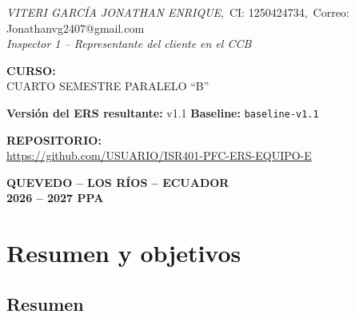 \documentclass[journal,onecolumn]{IEEEtran}
\newcommand{\guia}[2]{%
	\begin{mdframed}[style=guia]
		\sloppy
		\noindent\textbf{Responsable: #1}\\[2pt]
		#2
	\end{mdframed}
}
\newif\ifguias
\let\guiaoriginal\guia
\renewcommand{\guia}[2]{\ifguias\guiaoriginal{#1}{#2}\fi}
\begin{document}
\begin{titlepage}
		\textit{VITERI GARCÍA JONATHAN ENRIQUE},~CI: 1250424734,~Correo: Jonathanvg2407@gmail.com\\
		\textit{Inspector 1 -- Representante del cliente en el CCB}
		
		\vspace{0.5cm}
		
		{\normalsize\bfseries CURSO:}\\[4pt]
		{\normalsize CUARTO SEMESTRE PARALELO ``B''}
		
		\vspace{0.5cm}
		
		{\normalsize\bfseries Versión del ERS resultante:} v1.1 \quad
		{\normalsize\bfseries Baseline:} \texttt{baseline-v1.1}
		
		\vspace{0.3cm}
		
		{\normalsize\bfseries REPOSITORIO:}\\
		\url{https://github.com/USUARIO/ISR401-PFC-ERS-EQUIPO-E}
		
		\vspace{0.8cm}
		
		{\normalsize\bfseries QUEVEDO -- LOS RÍOS -- ECUADOR}\\[4pt]
		{\normalsize\bfseries 2026 -- 2027 PPA}
		
	\end{titlepage}
	
	\guia{Edson (Integrante 1)}{%
		Reemplazar \texttt{USUARIO} por el usuario real de GitHub y verificar que la URL quede en
		\textbf{una sola línea} y que el repositorio sea \textbf{público}: el criterio~G1 asigna
		CERO si la URL está rota o el repositorio no es accesible. Confirmar que la versión
		declarada aquí (v1.1) coincida exactamente con el historial de revisiones del ERS, con el
		\texttt{CHANGELOG.md} y con el tag de Git. Revisar también que los correos de la carátula
		sean los mismos configurados en \texttt{git config user.email} de cada integrante, para que
		la autoría de los commits quede vinculada (criterios~A2 y~A3).}
	
	\section{Resumen y objetivos}
	
	\subsection{Resumen}
	
\end{document}
